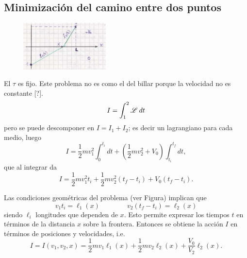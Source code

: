 \documentclass[10pt,oneside]{CBFT_book}
\begin{document}
\subsection{Minimización del camino entre dos puntos}


\begin{figure}[htb]
	\begin{center}
	\includegraphics[width=0.4\textwidth]{images/fig_mc_snell1.pdf}	 
	\end{center}
	\caption{}
	\label{fig_mc_snell1}
\end{figure}

El $ \tau $ es fijo.
Este problema no es como el del billar porque la velocidad no es constante [?].
\[
	I = \int_1^2 \mathscr{L} \: dt 
\]
pero se puede descomponer en $ I = I_1 + I_2 $; es decir un lagrangiano para cada medio, luego
\[
	I = \frac{1}{2} m v_1^2 \int_0^{t_i} dt + (\frac{1}{2} m v_2^2 + V_0) \int_{t_i}^{t_f} dt ,
\]
que al integrar da
\[
	I = \frac{1}{2} m v_1^2 t_i + \frac{1}{2} m v_2^2( t_f - t_i ) + V_0( t_f - t_i ).
\]

Las condiciones geométricas del problema (ver Figura) implican que 
\[
	v_1 t_i = \ell_1(x) \qquad \qquad v_2 ( t_f - t_i ) = \ell_2(x)
\]
siendo $ \ell_i $ longitudes que dependen de $ x $. Esto permite expresar los tiempos $t$ en términos
de la distancia $ x $ sobre la frontera. Entonces se obtiene la acción $I$ en términos de posiciones
y velocidades, i.e.
\[
	I = I(v_1,v_2 ,x) = \frac{1}{2} m v_1 \ell_1(x) + \frac{1}{2} m v_2 \ell_2(x) + \frac{V_0}{V_2} \ell_2(x).
\]
\end{document}
